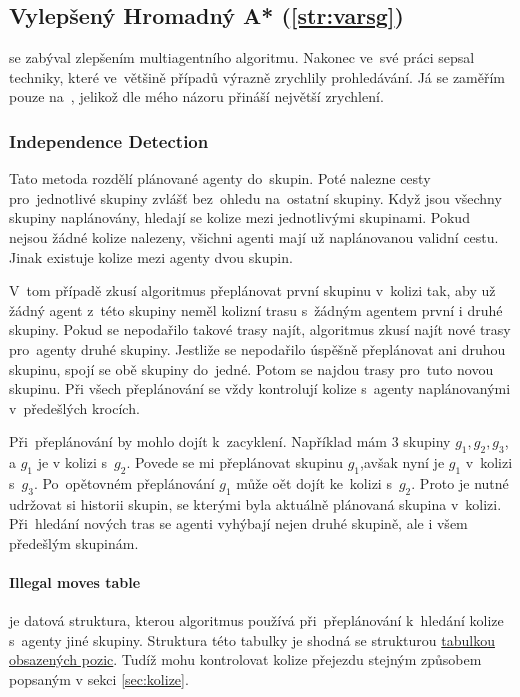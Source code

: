 \subsection{Vylepšený Hromadný A* (\ref{str:varsg})}\label{subsec:vylepseny_hromadny_a_star}

\citeauthor{Standley_2010} se zabýval zlepšením multiagentního  algoritmu.
Nakonec ve~své práci \citet*{Standley_2010} sepsal techniky, které ve~většině případů výrazně zrychlily prohledávání.
Já se zaměřím pouze na~,
jelikož dle mého názoru přináší největší zrychlení.

\subsubsection{Independence Detection}\label{subsubsec:varsg_independence_detection}

Tato metoda rozdělí plánované agenty do~skupin.
Poté nalezne cesty pro~jednotlivé skupiny zvlášť bez~ohledu na~ostatní skupiny.
Když jsou všechny skupiny naplánovány, hledají se kolize mezi jednotlivými skupinami.
Pokud nejsou žádné kolize nalezeny, všichni agenti mají už naplánovanou validní cestu.
Jinak existuje kolize mezi agenty dvou skupin.

V~tom případě zkusí algoritmus přeplánovat první skupinu v~kolizi tak,
aby už žádný agent z~této skupiny neměl kolizní trasu s~žádným agentem první i druhé skupiny.
Pokud se nepodařilo takové trasy najít, algoritmus zkusí najít nové trasy pro~agenty druhé skupiny.
Jestliže se nepodařilo úspěšně přeplánovat ani druhou skupinu, spojí se obě skupiny do~jedné.
Potom se najdou trasy pro~tuto novou skupinu.
Při všech přeplánování se vždy kontrolují kolize s~agenty naplánovanými v~předešlých krocích.

Při~přeplánování by mohlo dojít k~zacyklení.
Například mám $3$ skupiny $g_1, g_2, g_3$, a $g_1$ je v kolizi s~$g_2$.
Povede se mi přeplánovat skupinu $g_1$,avšak nyní je $g_1$ v~kolizi s~$g_3$.
Po~opětovném přeplánování $g_1$ může oět dojít ke~kolizi s~$g_2$.
Proto je nutné udržovat si historii skupin, se kterými byla aktuálně plánovaná skupina v~kolizi.
Při~hledání nových tras se agenti vyhýbají nejen druhé skupině, ale i všem předešlým skupinám.

\paragraph{Illegal moves table}\label{par:varsg_illegal_moves_table} je datová struktura,
kterou algoritmus používá při~přeplánování k~hledání kolize s~agenty jiné skupiny.
Struktura této tabulky je shodná se strukturou \hyperref[par:obsazene_pozice]{tabulkou obsazených pozic}.
Tudíž mohu kontrolovat kolize přejezdu stejným způsobem popsaným v sekci \ref{sec:kolize}.

